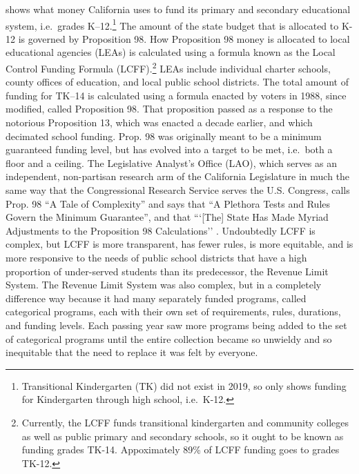  shows what money California uses to fund its primary and secondary educational system, i.e.~grades K–12.\footnote{Transitional Kindergarten (TK) did not exist in 2019, so  only shows funding  for Kindergarten through high school, i.e.~K-12.} The amount of the state budget that is allocated to K-12 is governed by Proposition 98. How Proposition 98 money is allocated to local educational agencies (LEAs) is calculated using a formula known as the Local Control Funding Formula (LCFF).\footnote{Currently, the LCFF funds transitional kindergarten and community colleges as well as public primary and secondary schools, so it ought to be known as funding grades TK-14. Appoximately 89\% of LCFF funding goes to grades TK-12.} LEAs include individual charter schools, county offices of education, and local public school districts. The total amount of funding for TK–14 is calculated using a formula enacted by voters in 1988, since modified, called Proposition 98. That proposition passed as a response to the notorious Proposition 13, which was enacted a decade earlier, and which decimated school funding. Prop. 98 was originally meant to be a minimum guaranteed funding level, but has evolved into a target to be met, i.e.~both a floor and a ceiling. The Legislative Analyst's Office (LAO), which serves as an independent, non-partisan research arm of the California Legislature in much the same way that the Congressional Research Service serves the U.S. Congress, calls Prop. 98 ``A Tale of Complexity''  and says that ``A Plethora Tests and Rules Govern the Minimum Guarantee'', and that ```[The] State Has Made Myriad Adjustments to the Proposition 98 Calculations'' \parencite[5]{LAO2017}.
Undoubtedly LCFF is complex, but LCFF is more transparent, has fewer rules, is more equitable, and is more responsive to the needs of public school districts that have a high proportion of under-served students than its predecessor, the Revenue Limit System. The Revenue Limit System was also complex, but in a completely difference way because it had many separately funded programs, called categorical programs, each with their own set of requirements, rules, durations, and funding levels. Each passing year saw more programs being added to the set of categorical programs until the entire collection became so unwieldy and so inequitable that the need to replace it was felt by everyone.

